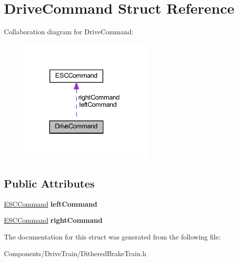 \hypertarget{struct_drive_command}{
\section{\-Drive\-Command \-Struct \-Reference}
\label{struct_drive_command}
}


\-Collaboration diagram for \-Drive\-Command\-:\nopagebreak
\begin{figure}[H]
\begin{center}
\leavevmode
\includegraphics[width=188pt]{struct_drive_command__coll__graph}
\end{center}
\end{figure}
\subsection*{\-Public \-Attributes}
\begin{DoxyCompactItemize}
\item 
\hypertarget{struct_drive_command_a9f02e63e3fa1f40e6835e9f4604eb4d7}{
\hyperlink{struct_e_s_c_command}{\-E\-S\-C\-Command} {\bfseries left\-Command}}
\label{struct_drive_command_a9f02e63e3fa1f40e6835e9f4604eb4d7}

\item 
\hypertarget{struct_drive_command_a5ab51f4cef05691b22348fa79280dee9}{
\hyperlink{struct_e_s_c_command}{\-E\-S\-C\-Command} {\bfseries right\-Command}}
\label{struct_drive_command_a5ab51f4cef05691b22348fa79280dee9}

\end{DoxyCompactItemize}


\-The documentation for this struct was generated from the following file\-:\begin{DoxyCompactItemize}
\item 
\-Components/\-Drive\-Train/\-Dithered\-Brake\-Train.\-h\end{DoxyCompactItemize}
